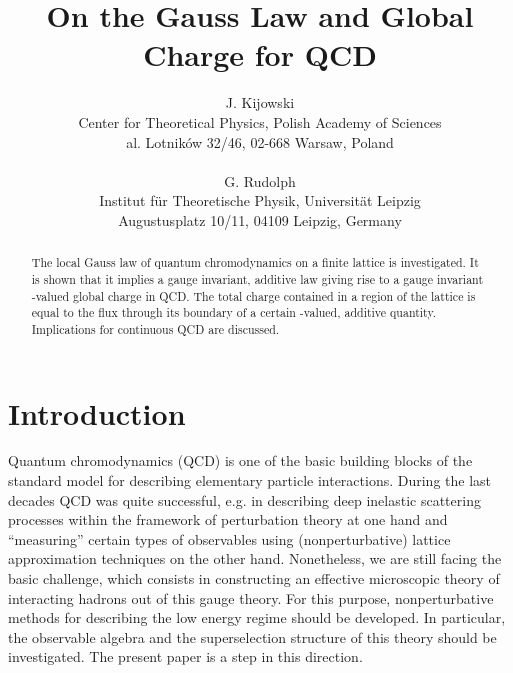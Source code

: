 \documentclass[a4paper,12pt]{article}
\begin{document}
\title{\bf On the Gauss Law and Global Charge for
QCD}

\author{
    J. Kijowski \\
    Center for Theoretical  Physics, Polish Academy of Sciences\\
    al. Lotnik\'ow 32/46, 02-668 Warsaw, Poland\\
    \ \\
    G. Rudolph \\
    Institut f\"ur Theoretische Physik, Universit\"at Leipzig\\
    Augustusplatz 10/11, 04109 Leipzig, Germany\\
    }

\maketitle



\begin{abstract}
The local Gauss law of quantum chromodynamics on a finite lattice
is investigated. It is shown that it implies a gauge invariant,
additive law giving rise to a gauge invariant \coordHE{}-valued global charge in QCD. The total charge contained in a
region of the lattice is equal to the flux through its boundary of
a certain \coordHE{}-valued, additive quantity. Implications
for continuous QCD are discussed.
\end{abstract}

\newpage


\vspace{0.5cm}




\setcounter{equation}{0}
\section{Introduction}
Quantum chromodynamics (QCD) is one of the basic building blocks
of the standard model for describing elementary particle
interactions. During the last decades QCD was quite successful,
e.g. in describing deep inelastic scattering processes within the
framework of perturbation theory at one hand and ``measuring''
certain types of observables using (nonperturbative) lattice
approximation techniques on the other hand. Nonetheless, we are
still facing the basic challenge, which consists in constructing
an effective microscopic theory of interacting hadrons out of this
gauge theory. For this purpose, nonperturbative methods for
describing the low energy regime should be developed. In
particular, the observable algebra and the superselection
structure of this theory should be investigated. The present paper
is a step in this direction.
\end{document}
